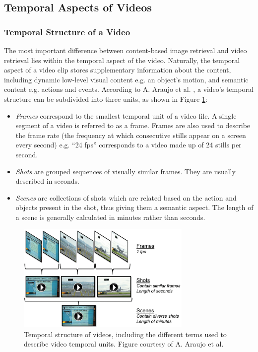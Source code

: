 
\subsection{Temporal Aspects of Videos}
\label{sec:temporal-aspect-videos}

\subsubsection{Temporal Structure of a Video}

The most important difference between content-based image retrieval and video retrieval lies within the temporal aspect of the video. Naturally, the temporal aspect of a video clip stores supplementary information about the content, including dynamic low-level visual content e.g. an object's motion, and semantic content e.g. actions and events. According to A. Araujo et al. \cite{araujo2017i2v}, a video's temporal structure can be subdivided into three units, as shown in Figure \ref{fig:temporal_structure}:
\begin{itemize}
    \item \textit{Frames} correspond to the smallest temporal unit of a video file. A single segment of a video is referred to as a frame. Frames are also used to describe the frame rate (the frequency at which consecutive stills appear on a screen every second) e.g. ``24 fps'' corresponds to a video made up of 24 stills per second.
    \item \textit{Shots} are grouped sequences of visually similar frames. They are usually described in seconds.
    \item \textit{Scenes} are collections of shots which are related based on the action and objects present in the shot, thus giving them a semantic aspect. The length of a scene is generally calculated in minutes rather than seconds.
\end{itemize}

\begin{figure}[h]
\centerline{\includegraphics[width=0.75\textwidth]{figures/litsurvey/temporal_structure_videos.png}}
\caption{\label{fig:temporal_structure}Temporal structure of videos, including the different terms used to describe video temporal units. Figure courtesy of A. Araujo et al.}
\end{figure}

